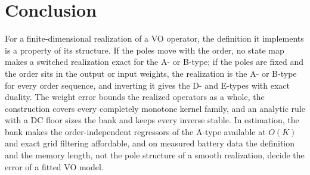\section{Conclusion}\label{sec:conclusion}

For a finite-dimensional realization of a VO operator, the definition it implements is a property of its structure. If the poles move with the order, no state map makes a switched realization exact for the A- or B-type; if the poles are fixed and the order sits in the output or input weights, the realization is the A- or B-type for every order sequence, and inverting it gives the D- and E-types with exact duality. The weight error bounds the realized operators as a whole, the construction covers every completely monotone kernel family, and an analytic rule with a DC floor sizes the bank and keeps every inverse stable. In estimation, the bank makes the order-independent regressors of the A-type available at $O(K)$ and exact grid filtering affordable, and on measured battery data the definition and the memory length, not the pole structure of a smooth realization, decide the error of a fitted VO model.

\ifsp\else
\appendices

\fi
